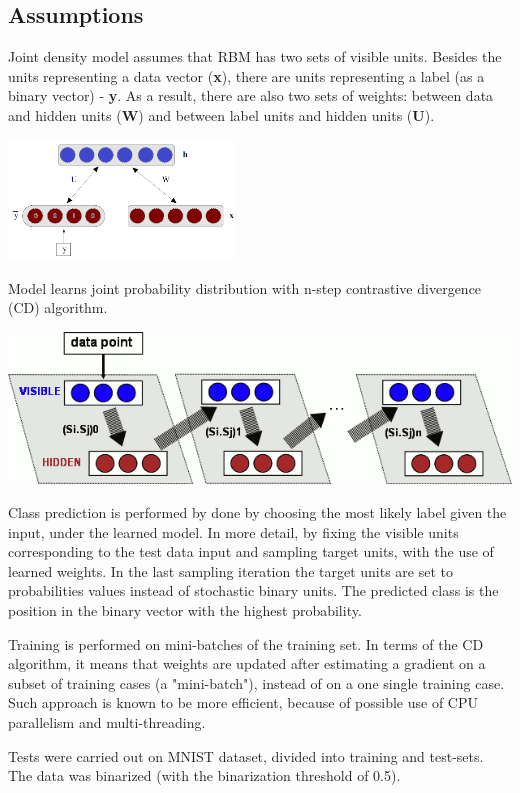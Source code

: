 \documentclass[a4paper]{scrartcl}
\begin{document}
\subsection{Assumptions}
Joint density model assumes that RBM has two sets of visible units. Besides the units representing a data vector ({\bf x}), there are units representing a label (as a binary vector) - {\bf y}. As a result, there are also two sets of weights: between data and hidden units ({\bf W}) and between label units and hidden units ({\bf U}). 
\begin{center}
\includegraphics[width=6cm]{images/jointProbModel.png}
\end{center}
Model learns joint probability distribution with n-step contrastive divergence (CD) algorithm.
\begin{center}
\includegraphics[width=14cm]{images/trainRBM.png}
\end{center} 
\par Class prediction is performed by done by choosing the most likely label given the input, under the learned model. In more detail, by fixing the visible units corresponding to the test data input and sampling target units, with the use of learned weights. In the last sampling iteration the target units are set to probabilities values instead of stochastic binary units. The predicted class is the position in the binary vector with the highest probability.
\par Training is performed on mini-batches of the training set. In terms of the CD algorithm, it means that weights are updated after estimating a gradient on a subset of training cases (a "mini-batch"), instead of on a one single training case. Such approach is known to be more efficient, because of possible use of CPU parallelism and multi-threading.
\par Tests were carried out on MNIST dataset, divided into training and test-sets. The data was binarized (with the binarization threshold of 0.5). 
\end{document}
